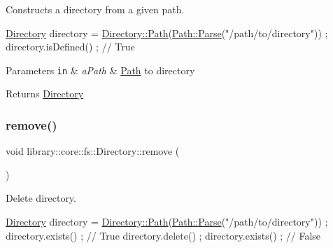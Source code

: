 Constructs a directory from a given path. 


\begin{DoxyCode}
\hyperlink{classlibrary_1_1core_1_1fs_1_1Directory_a3ec39f6cad19a81d520e9a1f2d8bb1f7}{Directory} directory = \hyperlink{classlibrary_1_1core_1_1fs_1_1Directory_a6d3ea04654841e62a4dbd99feb563caf}{Directory::Path}(\hyperlink{classlibrary_1_1core_1_1fs_1_1Path_aebf5bd3af83e0b7376616e146f3e55df}{Path::Parse}(\textcolor{stringliteral}{"/path/to/directory"}))
       ;
directory.isDefined() ; \textcolor{comment}{// True}
\end{DoxyCode}



\begin{DoxyParams}[1]{Parameters}
\mbox{\tt in}  & {\em a\+Path} & \hyperlink{classlibrary_1_1core_1_1fs_1_1Path}{Path} to directory \\
\hline
\end{DoxyParams}
\begin{DoxyReturn}{Returns}
\hyperlink{classlibrary_1_1core_1_1fs_1_1Directory}{Directory} 
\end{DoxyReturn}
\mbox{\label{classlibrary_1_1core_1_1fs_1_1Directory_a8392a637e3b8cc07f55c0bc2850fb42b}} 
\subsubsection{\texorpdfstring{remove()}{remove()}}
{\footnotesize\ttfamily void library\+::core\+::fs\+::\+Directory\+::remove (\begin{DoxyParamCaption}{ }\end{DoxyParamCaption})}



Delete directory. 


\begin{DoxyCode}
\hyperlink{classlibrary_1_1core_1_1fs_1_1Directory_a3ec39f6cad19a81d520e9a1f2d8bb1f7}{Directory} directory = \hyperlink{classlibrary_1_1core_1_1fs_1_1Directory_a6d3ea04654841e62a4dbd99feb563caf}{Directory::Path}(\hyperlink{classlibrary_1_1core_1_1fs_1_1Path_aebf5bd3af83e0b7376616e146f3e55df}{Path::Parse}(\textcolor{stringliteral}{"/path/to/directory"}))
       ;
directory.exists() ; \textcolor{comment}{// True}
directory.delete() ;
directory.exists() ; \textcolor{comment}{// False}
\end{DoxyCode}
 \mbox{\label{classlibrary_1_1core_1_1fs_1_1Directory_abc9c7c9f9129950cd89c9dbd77978b8f}} 
